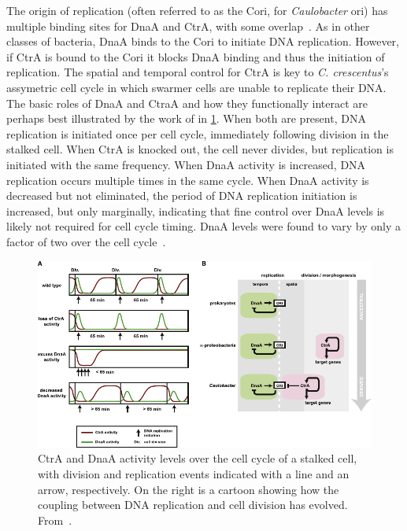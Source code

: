 The origin of replication (often referred to as the Cori, for \textit{Caulobacter} ori) has multiple binding sites for DnaA and CtrA, with some overlap~\cite{frandi2019}.
As in other classes of bacteria, DnaA binds to the Cori to initiate DNA replication.
However, if CtrA is bound to the Cori it blocks DnaA binding and thus the initiation of replication.
The spatial and temporal control for CtrA is key to \textit{C. crescentus}'s assymetric cell cycle in which swarmer cells are unable to replicate their DNA.
The basic roles of DnaA and CtraA and how they functionally interact are perhaps best illustrated by the work of \textcite{jonas2011} in \cref{fig:ctra-dnaa}.
When both are present, DNA replication is initiated once per cell cycle, immediately following division in the stalked cell.
When CtrA is knocked out, the cell never divides, but replication is initiated with the same frequency.
When DnaA activity is increased, DNA replication occurs multiple times in the same cycle.
When DnaA activity is decreased but not eliminated, the period of DNA replication initiation is increased, but only marginally, indicating that fine control over DnaA levels is likely not required for cell cycle timing.
DnaA levels were found to vary by only a factor of two over the cell cycle~\cite{felletti2019}.

\begin{figure}
    \centering
    \includegraphics{ctra-dnaa}
    \caption{
        CtrA and DnaA activity levels over the cell cycle of a stalked cell, with division and replication events indicated with a line and an arrow, respectively.
        On the right is a cartoon showing how the coupling between DNA replication and cell division has evolved.
        From~\cite{jonas2011}.
        \label{fig:ctra-dnaa}
     }
\end{figure}

